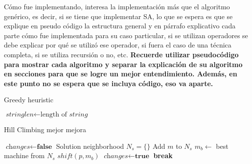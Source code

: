 \documentclass[../informe2.tex]{subfiles}
\begin{document}
Cómo fue implementando, interesa la implementación más que el algoritmo
genérico, es decir, si se tiene que implementar SA, lo que se espera
es que se explique en pseudo código la estructura general y en párrafo
explicativo cada parte cómo fue implementada para su caso particular,
si se utilizan operadores se debe explicar por qué se utilizó ese
operador, si fuera el caso de una técnica completa, si se utiliza
recursión o no, etc. \textbf{Recuerde utilizar pseudocódigo para mostrar
cada algoritmo y separar la explicación de su algoritmo en secciones
para que se logre un mejor entendimiento. Además, en este punto no
se espera que se incluya código, eso va aparte.}

\begin{algorithm}
	\caption{Greedy heuristic}
	\label{algorithm:greedy}
	\begin{algorithmic}[1]
		\State $\textit{stringlen} \gets \text{length of }\textit{string}$
		\EndProcedure
	\end{algorithmic}
\end{algorithm}

\begin{algorithm}
	\caption{Hill Climbing mejor mejora}
	\label{algorithm:HC}
	\begin{algorithmic}[1]
		\Repeat
		\State $\textit{changes}\gets \textbf{false}$
		\State Solution neighborhood $N_s = \{\}$
		\State Add $m$ to $N_s$
		\EndIf
		\EndFor
		\State $m_b \gets$ best machine  from $N_s$
		\State $shift(p, m_b)$
		\State $\textit{changes}\gets \textbf{true}$
		\EndIf
		\State \textbf{break}
		\EndIf
		\EndFor
		\EndProcedure
	\end{algorithmic}
\end{algorithm}
\end{document}
